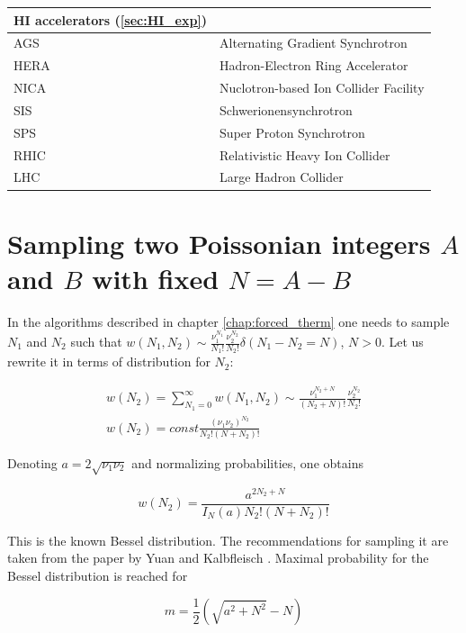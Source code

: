 \begin{table}
\begin{tabular}{ll}
    \midrule
    HI accelerators (\ref{sec:HI_exp}) \\
    \midrule
    AGS & Alternating Gradient Synchrotron \\
    HERA &  Hadron-Electron Ring Accelerator \\
    NICA &  Nuclotron-based Ion Collider Facility \\
    SIS  &  Schwerionensynchrotron \\
    SPS  &  Super Proton Synchrotron \\
    RHIC &  Relativistic Heavy Ion Collider \\
    LHC  &  Large Hadron Collider \\
    \bottomrule
  \end{tabular}
\end{table}

\chapter{Sampling two Poissonian integers $A$ and $B$ with fixed $N = A - B$}
\label{app:sampling}

In the algorithms described in chapter \ref{chap:forced_therm}  one needs to
sample ${N_1}$ and ${N_2}$ such that $w({N_1},{N_2}) \sim
\frac{\nu_1^{N_1}}{{N_1}!} \frac{\nu_2^{N_2}}{{N_2}!} \delta({N_1}-{N_2} = N)$,
$N > 0$. Let us rewrite it in terms of distribution for $N_2$:

\begin{eqnarray}
  w(N_2) = \sum_{N_1=0}^{\infty} w(N_1,N_2) \sim
           \frac{\nu_1^{N_2+N}}{(N_2+N)!} \frac{\nu_2^{N_2}}{N_2!} \\
  w(N_2) = const \frac{(\nu_1 \nu_2)^{N_2}}{N_2!(N+N_2)!}
\end{eqnarray}

Denoting $a = 2\sqrt{\nu_1 \nu_2}$ and normalizing probabilities, one obtains

\begin{equation}
  w(N_2) = \frac{a^{2N_2 + N}}{I_N(a) N_2! (N+N_2)!}
\end{equation}

This is the known Bessel distribution. The recommendations for sampling it are taken
from the paper by Yuan and Kalbfleisch \cite{Yuan2000}. Maximal probability for
the Bessel distribution is reached for

\begin{equation}
  m = \frac{1}{2} \left(\sqrt{a^2 + N^2} - N \right)
\end{equation}

